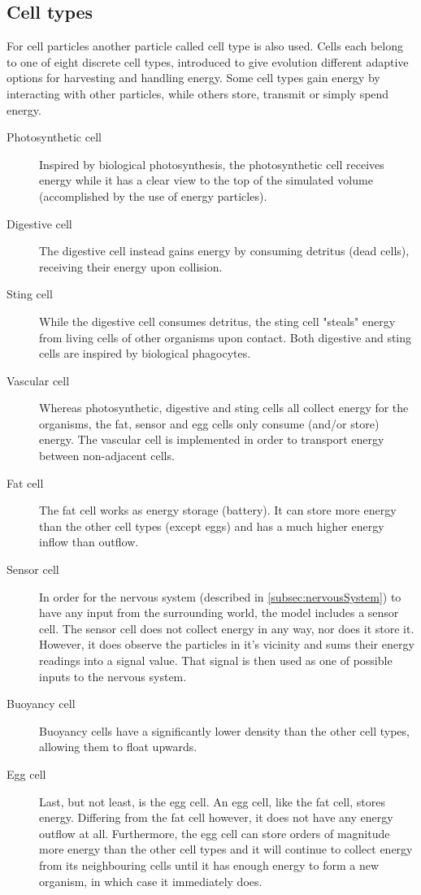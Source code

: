 \subsection{Cell types} \label{subsec:cellTypes}
For cell particles another particle called cell type is also used. Cells each belong to one of eight discrete cell types, introduced to give evolution different adaptive options for harvesting and handling energy. Some cell types gain energy by interacting with other particles, while others store, transmit or simply spend energy.
\begin{description}
    \item [Photosynthetic cell] Inspired by biological photosynthesis, the photosynthetic cell receives energy while it has a clear view to the top of the simulated volume (accomplished by the use of energy particles).
    \item [Digestive cell] %
    The digestive cell instead gains energy by consuming detritus (dead cells), receiving their energy upon collision.
    \item [Sting cell] %
    While the digestive cell consumes detritus, the sting cell "steals" energy from living cells of other organisms upon contact. Both digestive and sting cells are inspired by biological phagocytes.
    \item [Vascular cell] Whereas photosynthetic, digestive and sting cells all collect energy for the organisms, the fat, sensor and egg cells only consume (and/or store) energy. The vascular cell is implemented in order to transport energy between non-adjacent cells.
    \item [Fat cell] The fat cell works as energy storage (battery). It can store more energy than the other cell types (except eggs) and has a much higher energy inflow than outflow.
    \item [Sensor cell] In order for the nervous system (described in \ref{subsec:nervousSystem}) to have any input from the surrounding world, the model includes a sensor cell. The sensor cell does not collect energy in any way, nor does it store it. However, it does observe the particles in it's vicinity and sums their energy readings into a signal value. That signal is then used as one of possible inputs to the nervous system.
    \item [Buoyancy cell] Buoyancy cells have a significantly lower density than the other cell types, allowing them to float upwards. 
    \item [Egg cell] Last, but not least, is the egg cell. An egg cell, like the fat cell, stores energy. Differing from the fat cell however, it does not have any energy outflow at all. Furthermore, the egg cell can store orders of magnitude more energy than the other cell types and it will continue to collect energy from its neighbouring cells until it has enough energy to form a new organism, in which case it immediately does.
\end{description}


